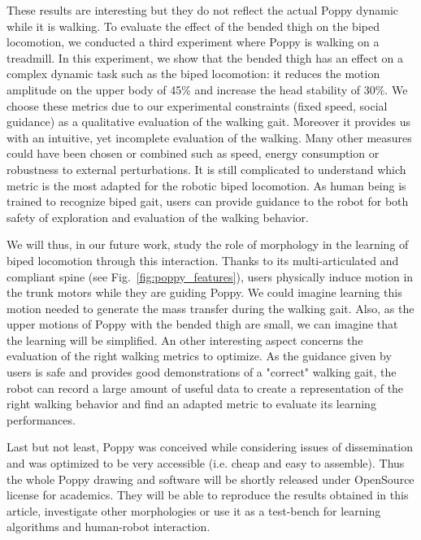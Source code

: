 These results are interesting but they do not reflect the actual Poppy dynamic while it is walking.
To evaluate the effect of the bended thigh on the biped locomotion, we conducted a third experiment where Poppy is walking on a treadmill.
In this experiment, we show that the bended thigh has an effect on a complex dynamic task such as the biped locomotion: it reduces the motion amplitude on the upper body of 45\% and increase the head stability of 30\%.
We choose these metrics due to our experimental constraints (fixed speed, social guidance) as a qualitative evaluation of the walking gait.
Moreover it provides us with an intuitive, yet incomplete evaluation of the walking.
Many other measures could have been chosen or combined such as speed, energy consumption or robustness to external perturbations.
It is still complicated to understand which metric is the most adapted for the robotic biped locomotion.
As human being is trained to recognize biped gait, users can provide guidance to the robot for both safety of exploration and evaluation of the walking behavior.

We will thus, in our future work, study the role of morphology in the learning of biped locomotion through this interaction.
Thanks to its multi-articulated and compliant spine (see Fig.~\ref{fig:poppy_features}), users physically induce motion in the trunk motors while they are guiding Poppy.
We could imagine learning this motion needed to generate the mass transfer during the walking gait.
Also, as the upper motions of Poppy with the bended thigh are small, we can imagine that the learning will be simplified.
An other interesting aspect concerns the evaluation of the right walking metrics to optimize.
As the guidance given by users is safe and provides good demonstrations of a "correct" walking gait, the robot can record a large amount of useful data to create a representation of the right walking behavior and find an adapted metric to evaluate its learning performances.

Last but not least, Poppy was conceived while considering issues of dissemination and was optimized to be very accessible (i.e.
cheap and easy to assemble).
Thus the whole Poppy drawing and software will be shortly released under OpenSource license for academics.
They will be able to reproduce the results obtained in this article, investigate other morphologies or use it as a test-bench for learning algorithms and human-robot interaction.
